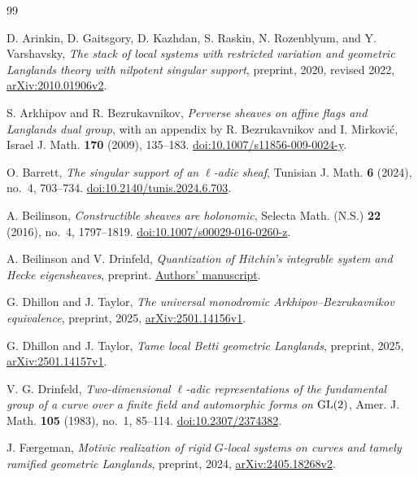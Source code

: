 \begin{thebibliography}{99}
\raggedright

D. Arinkin, D. Gaitsgory, D. Kazhdan, S. Raskin, N. Rozenblyum, and
Y. Varshavsky, \emph{The stack of local systems with restricted variation
and geometric Langlands theory with nilpotent singular support},
preprint, 2020, revised 2022,
\href{https://arxiv.org/abs/2010.01906v2}{arXiv:2010.01906v2}.

S. Arkhipov and R. Bezrukavnikov, \emph{Perverse sheaves on affine flags
and Langlands dual group}, with an appendix by R. Bezrukavnikov and
I. Mirkovi\'c, Israel J. Math. \textbf{170} (2009), 135--183.
\href{https://doi.org/10.1007/s11856-009-0024-y}{doi:10.1007/s11856-009-0024-y}.

O. Barrett, \emph{The singular support of an $\ell$-adic sheaf},
Tunisian J. Math. \textbf{6} (2024), no.~4, 703--734.
\href{https://doi.org/10.2140/tunis.2024.6.703}{doi:10.2140/tunis.2024.6.703}.

A. Beilinson, \emph{Constructible sheaves are holonomic},
Selecta Math. (N.S.) \textbf{22} (2016), no.~4, 1797--1819.
\href{https://doi.org/10.1007/s00029-016-0260-z}{doi:10.1007/s00029-016-0260-z}.

A. Beilinson and V. Drinfeld, \emph{Quantization of Hitchin's integrable
system and Hecke eigensheaves}, preprint.
\href{https://math.uchicago.edu/~drinfeld/langlands/QuantizationHitchin.pdf}{Authors' manuscript}.

G. Dhillon and J. Taylor, \emph{The universal monodromic
Arkhipov--Bezrukavnikov equivalence}, preprint, 2025,
\href{https://arxiv.org/abs/2501.14156v1}{arXiv:2501.14156v1}.

G. Dhillon and J. Taylor, \emph{Tame local Betti geometric Langlands},
preprint, 2025,
\href{https://arxiv.org/abs/2501.14157v1}{arXiv:2501.14157v1}.

V. G. Drinfeld, \emph{Two-dimensional $\ell$-adic representations of the
fundamental group of a curve over a finite field and automorphic forms
on $\operatorname{GL}(2)$}, Amer. J. Math. \textbf{105} (1983), no.~1, 85--114.
\href{https://doi.org/10.2307/2374382}{doi:10.2307/2374382}.

J. F{\ae}rgeman, \emph{Motivic realization of rigid $G$-local systems on
curves and tamely ramified geometric Langlands}, preprint, 2024,
\href{https://arxiv.org/abs/2405.18268v2}{arXiv:2405.18268v2}.


\end{thebibliography}
